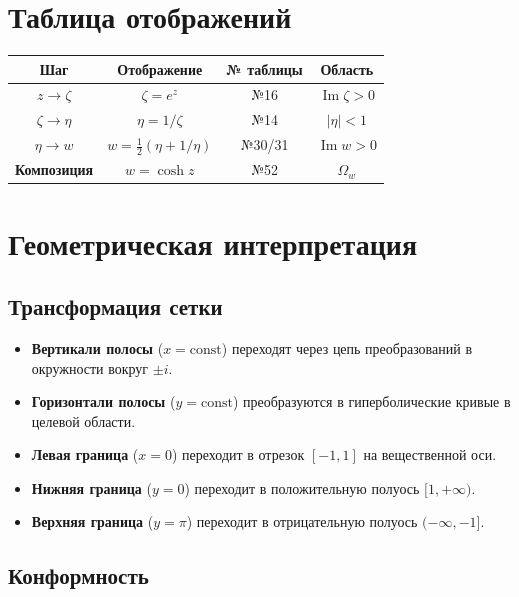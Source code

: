 \documentclass[12pt,a4paper]{article}
\begin{document}
\section{Таблица отображений}

\begin{center}
\begin{tabular}{|c|c|c|c|}
\hline
\textbf{Шаг} & \textbf{Отображение} & \textbf{№ таблицы} & \textbf{Область} \\
\hline
$z \to \zeta$ & $\zeta = e^z$ & №16 & $\operatorname{Im} \zeta > 0$ \\
$\zeta \to \eta$ & $\eta = 1/\zeta$ & №14 & $|\eta| < 1$ \\
$\eta \to w$ & $w = \frac{1}{2}(\eta + 1/\eta)$ & №30/31 & $\operatorname{Im} w > 0$ \\
\hline
\textbf{Композиция} & $w = \cosh z$ & №52 & $\Omega_w$ \\
\hline
\end{tabular}
\end{center}

\section{Геометрическая интерпретация}

\subsection{Трансформация сетки}

\begin{itemize}
    \item \textbf{Вертикали полосы} ($x = \text{const}$) переходят через цепь преобразований в окружности вокруг $\pm i$.
    \item \textbf{Горизонтали полосы} ($y = \text{const}$) преобразуются в гиперболические кривые в целевой области.
    \item \textbf{Левая граница} ($x = 0$) переходит в отрезок $[-1, 1]$ на вещественной оси.
    \item \textbf{Нижняя граница} ($y = 0$) переходит в положительную полуось $[1, +\infty)$.
    \item \textbf{Верхняя граница} ($y = \pi$) переходит в отрицательную полуось $(-\infty, -1]$.
\end{itemize}

\subsection{Конформность}
\end{document}
